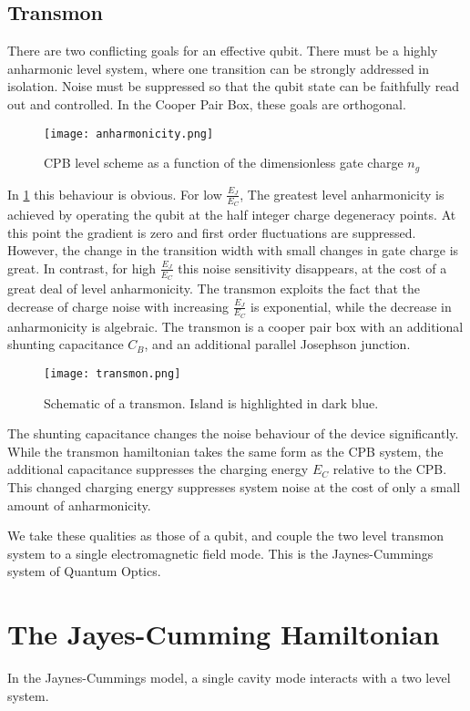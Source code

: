 \subsection{Transmon}
There are two conflicting goals for an effective qubit. 
There must be a highly anharmonic level system, where one transition can be strongly addressed in isolation. 
Noise must be suppressed so that the qubit state can be faithfully read out and controlled. 
In the Cooper Pair Box, these goals are orthogonal.
\begin{figure}[t]
  \texttt{[image: anharmonicity.png]}
  \caption{CPB level scheme as a function of the dimensionless gate charge $n_g$ \cite{Koch2007}}
  \label{anharmonicity}
\end{figure}
In \ref{anharmonicity} this behaviour is obvious. 
For low $\frac{E_J}{E_C}$, The greatest level anharmonicity is achieved by operating the qubit at the half integer charge degeneracy points.
At this point the gradient is zero and first order fluctuations are suppressed. 
However, the change in the transition width with small changes in gate charge is great. 
In contrast, for high $\frac{E_J}{E_C}$ this noise sensitivity disappears, at the cost of a great deal of level anharmonicity.
The transmon exploits the fact that the decrease of charge noise with increasing $\frac{E_J}{E_C}$ is exponential, while the decrease in anharmonicity is algebraic.
The transmon is a cooper pair box with an additional shunting capacitance $C_B$, and an additional parallel Josephson junction.
\begin{figure}[t]
  \texttt{[image: transmon.png]}
  \caption{Schematic of a transmon. Island is highlighted in dark blue\cite{Koch2007}.}
\end{figure}
The shunting capacitance changes the noise behaviour of the device significantly.
While the transmon hamiltonian takes the same form as the CPB system, the additional capacitance suppresses the charging energy $E_C$ relative to the CPB.
This changed charging energy suppresses system noise at the cost of only a small amount of anharmonicity. 

We take these qualities as those of a qubit, and couple the two level transmon system to a single electromagnetic field mode.
This is the Jaynes-Cummings system of Quantum Optics.
\section{The Jayes-Cumming Hamiltonian}
In the Jaynes-Cummings model, a single cavity mode interacts with a two level system. 

